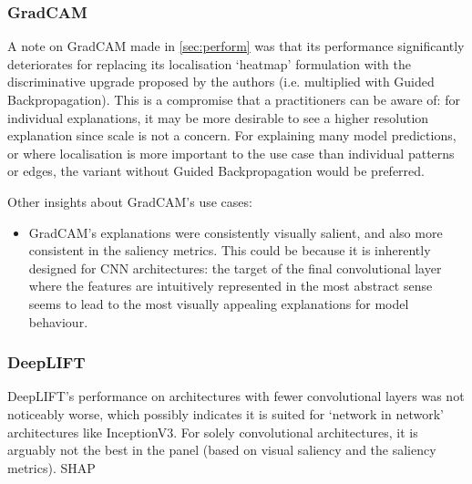 \documentclass[main]{subfiles}
\begin{document}
\subsubsection{GradCAM}
A note on GradCAM made in \ref{sec:perform} was that its performance significantly deteriorates for replacing its localisation `heatmap' formulation with the discriminative upgrade proposed by the authors (i.e. multiplied with Guided Backpropagation). This is a compromise that a practitioners can be aware of: for individual explanations, it may be more desirable to see a higher resolution explanation since scale is not a concern. For explaining many model predictions, or where localisation is more important to the use case than individual patterns or edges, the variant without Guided Backpropagation would be preferred.

Other insights about GradCAM's use cases:
\begin{itemize}
\item GradCAM's explanations were consistently visually salient, and also more consistent in the saliency metrics. This could be because it is inherently designed for CNN architectures: the target of the final convolutional layer where the features are intuitively represented in the most abstract sense seems to lead to the most visually appealing explanations for model behaviour.
\end{itemize}

\newpage
\subsubsection{DeepLIFT}

DeepLIFT's performance on architectures with fewer convolutional layers was not noticeably worse, which possibly indicates it is suited for `network in network' architectures like InceptionV3. For solely convolutional architectures, it is arguably not the best in the panel (based on visual saliency and the saliency metrics). SHAP 

\end{document}

